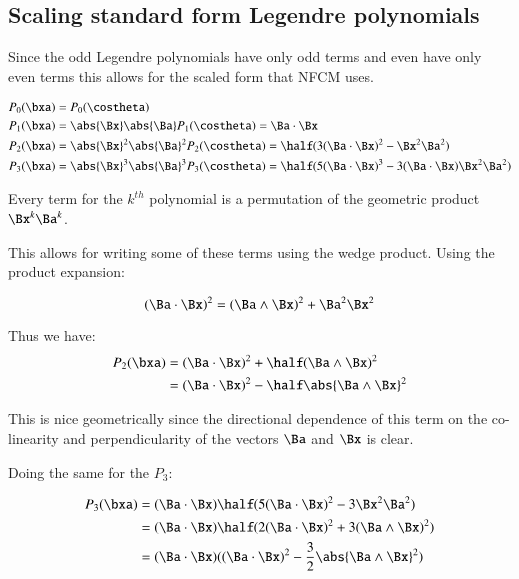 \subsection{ Scaling standard form Legendre polynomials }

Since the odd Legendre polynomials have only odd terms and even have only even terms this allows for
the scaled form that NFCM uses.

\begin{align*}
P_0(\bxa) &= P_0(\costheta) \\
P_1(\bxa) &= \abs{\Bx}\abs{\Ba} P_1(\costheta) = \Ba \cdot \Bx \\
P_2(\bxa) &= \abs{\Bx}^2\abs{\Ba}^2 P_2(\costheta) = \half(3(\Ba \cdot \Bx)^2 - \Bx^2\Ba^2) \\
P_3(\bxa) &= \abs{\Bx}^3\abs{\Ba}^3 P_3(\costheta) = \half(5(\Ba \cdot \Bx)^3 - 3(\Ba \cdot \Bx) \Bx^2\Ba^2) \\
\end{align*}

Every term for the $k^{th}$ polynomial is a permutation of the geometric product $\Bx^k\Ba^k$.

This allows for writing some of these terms using the wedge product.  Using the product expansion:

\[
(\Ba \cdot \Bx)^2 = ( \Ba \wedge \Bx )^2 + \Ba^2 \Bx^2
\]

Thus we have:
\begin{align*}
P_2(\bxa)
&= (\Ba \cdot \Bx)^2 + \half(\Ba \wedge \Bx)^2 \\
&= (\Ba \cdot \Bx)^2 - \half\abs{\Ba \wedge \Bx}^2 \\
\end{align*}

This is nice geometrically since the directional dependence of this term on the co-linearity and 
perpendicularity of the vectors $\Ba$ and $\Bx$ is clear.

Doing the same for the $P_3$:

\begin{align*}
P_3(\bxa) &= (\Ba \cdot \Bx)\half(5(\Ba \cdot \Bx)^2 - 3\Bx^2\Ba^2) \\
          &= (\Ba \cdot \Bx)\half(2(\Ba \cdot \Bx)^2 + 3(\Ba \wedge \Bx)^2) \\
          &= (\Ba \cdot \Bx)((\Ba \cdot \Bx)^2 - \frac{3}{2}\abs{\Ba \wedge \Bx}^2) \\
\end{align*}


